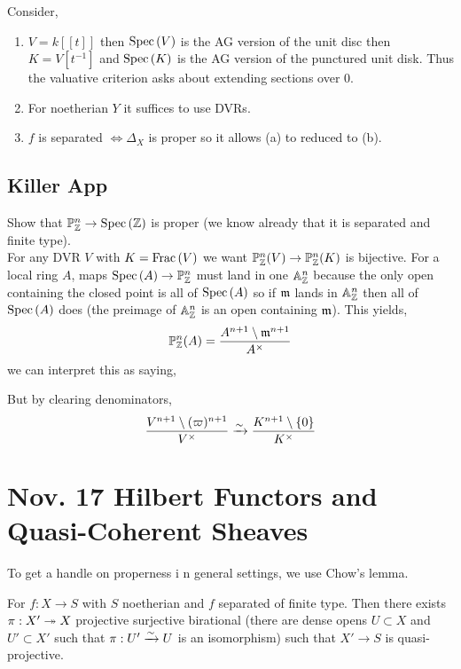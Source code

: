 \documentclass[12pt]{article}
\begin{document}
\begin{rmk}
Consider,
\begin{enumerate}
\item $V = k[[t]]$ then $\mathrm{Spec}\left( V \right)$ is the AG version of the unit disc then $K = V[t^{-1}]$ and $\mathrm{Spec}\left( K \right)$ is the AG version of the punctured unit disk. Thus the valuative criterion asks about extending sections over $0$.
\item For noetherian $Y$ it suffices to use DVRs.
\item $f$ is separated $\iff \Delta_X$ is proper so it allows (a) to reduced to (b). 
\end{enumerate}
\end{rmk}

\subsection{Killer App}

Show that $\mathbb{P}^n_{\mathbb{Z}} \to \mathrm{Spec}\left( \mathbb{Z} \right)$ is proper (we know already that it is separated and finite type). 
\bigskip\\
For any DVR $V$ with $K = \mathrm{Frac}\left(V\right)$ we want $\mathbb{P}^n_{\mathbb{Z}}(V) \to \mathbb{P}^n_{\mathbb{Z}}(K)$ is bijective. For a local ring $A$, maps $\mathrm{Spec}\left( A \right) \to \mathbb{P}^n_{\mathbb{Z}}$ must land in one $\mathbb{A}^{n}_{\mathbb{Z}}$ because the only open containing the closed point is all of $\mathrm{Spec}\left( A \right)$ so if $\mathfrak{m}$ lands in $\mathbb{A}^n_{\mathbb{Z}}$ then all of $\mathrm{Spec}\left( A \right)$ does (the preimage of $\mathbb{A}^n_{\mathbb{Z}}$ is an open containing $\mathfrak{m}$). This yields,
\[ \mathbb{P}^n_{\mathbb{Z}}(A) = \frac{A^{n+1} \setminus \mathfrak{m}^{n+1}}{A^\times} \]
we can interpret this as saying,
\begin{center}
\end{center}
But by clearing denominators,
\[ \frac{V^{n+1} \setminus (\varpi)^{n+1}}{V^\times} \xrightarrow{\sim} \frac{K^{n+1} \setminus \{ 0 \}}{K^\times} \]

\section{Nov. 17 Hilbert Functors and Quasi-Coherent Sheaves}

To get a handle on properness i n general settings, we use Chow's lemma.

\begin{lemma}
For $f : X \to S$ with $S$ noetherian and $f$ separated of finite type. Then there exists $\pi : X' \twoheadrightarrow X$ projective surjective birational (there are dense opens $U \subset X$ and $U' \subset X'$ such that $\pi : U' \xrightarrow{\sim} U$ is an isomorphism) such that $X' \to S$ is quasi-projective.
\end{lemma}
\end{document}
